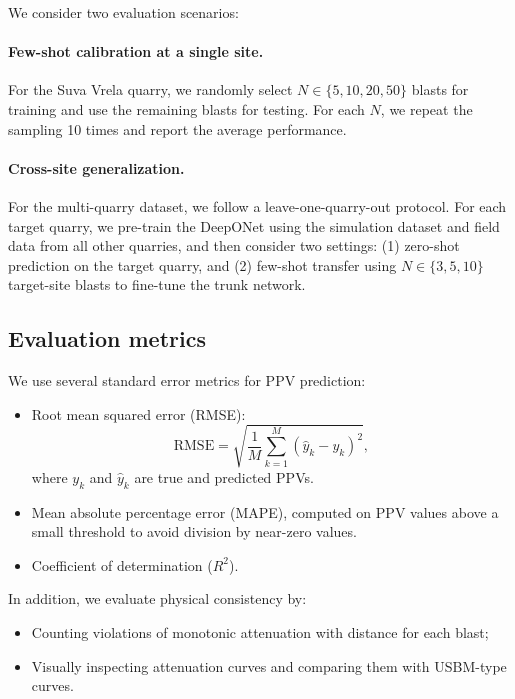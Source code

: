 \documentclass[a4paper,fleqn]{cas-sc}
\begin{document}
We consider two evaluation scenarios:

\paragraph{Few-shot calibration at a single site.}
For the Suva Vrela quarry, we randomly select $N \in \{5,10,20,50\}$ blasts for training
and use the remaining blasts for testing.
For each $N$, we repeat the sampling 10 times and report the average performance.

\paragraph{Cross-site generalization.}
For the multi-quarry dataset, we follow a leave-one-quarry-out protocol.
For each target quarry, we pre-train the DeepONet using the simulation dataset
and field data from all other quarries,
and then consider two settings:
(1) zero-shot prediction on the target quarry,
and (2) few-shot transfer using $N \in \{3,5,10\}$ target-site blasts
to fine-tune the trunk network.

\subsection{Evaluation metrics}

We use several standard error metrics for PPV prediction:
\begin{itemize}
  \item Root mean squared error (RMSE):
        \begin{equation}
            \mathrm{RMSE}
            = \sqrt{\frac{1}{M}\sum_{k=1}^{M} (\hat{y}_k - y_k)^2},
        \end{equation}
        where $y_k$ and $\hat{y}_k$ are true and predicted PPVs.
  \item Mean absolute percentage error (MAPE),
        computed on PPV values above a small threshold to avoid division by near-zero values.
  \item Coefficient of determination ($R^2$).
\end{itemize}

In addition, we evaluate physical consistency by:
\begin{itemize}
  \item Counting violations of monotonic attenuation with distance for each blast;
  \item Visually inspecting attenuation curves and comparing them with USBM-type curves.
\end{itemize}
\end{document}
